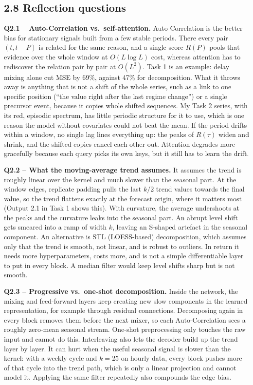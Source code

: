 \documentclass[11pt]{article}
\begin{document}
\subsection*{2.8 Reflection questions}

\textbf{Q2.1 -- Auto-Correlation vs.\ self-attention.} Auto-Correlation is the better bias for
stationary signals built from a few stable periods. There every pair $(t, t-P)$ is related for the
same reason, and a single score $R(P)$ pools that evidence over the whole window at $O(L\log L)$
cost, whereas attention has to rediscover the relation pair by pair at $O(L^2)$. Task 1 is an
example: delay mixing alone cut MSE by 69\%, against 47\% for decomposition. What it throws away is
anything that is not a shift of the whole series, such as a link to one specific position (``the
value right after the last regime change'') or a single precursor event, because it copies whole
shifted sequences. My Task 2 series, with its red, episodic spectrum, has little periodic structure
for it to use, which is one reason the model without covariates could not beat the mean. If the
period drifts within a window, no single lag lines everything up: the peaks of $R(\tau)$ widen and
shrink, and the shifted copies cancel each other out. Attention degrades more gracefully because
each query picks its own keys, but it still has to learn the drift.

\textbf{Q2.2 -- What the moving-average trend assumes.} It assumes the trend is roughly linear over
the kernel and much slower than the seasonal part. At the window edges, replicate padding pulls the
last $k/2$ trend values towards the final value, so the trend flattens exactly at the forecast
origin, where it matters most (Output 2.1 in Task 1 shows this). With curvature, the average
undershoots at the peaks and the curvature leaks into the seasonal part. An abrupt level shift
gets smeared into a ramp of width $k$, leaving an S-shaped artefact in the seasonal component. An
alternative is STL (LOESS-based) decomposition, which assumes only that the trend is smooth, not
linear, and is robust to outliers. In return it needs more hyperparameters, costs more, and is not
a simple differentiable layer to put in every block. A median filter would keep level shifts sharp
but is not smooth.

\textbf{Q2.3 -- Progressive vs.\ one-shot decomposition.} Inside the network, the mixing and
feed-forward layers keep creating new slow components in the learned representation, for example
through residual connections. Decomposing again in every block removes them before the next mixer,
so each Auto-Correlation sees a roughly zero-mean seasonal stream. One-shot preprocessing only
touches the raw input and cannot do this. Interleaving also lets the decoder build up the trend
layer by layer. It can hurt when the useful seasonal signal is slower than the kernel: with a
weekly cycle and $k=25$ on hourly data, every block pushes more of that cycle into the trend path,
which is only a linear projection and cannot model it. Applying the same filter repeatedly also
compounds the edge bias.
\end{document}
